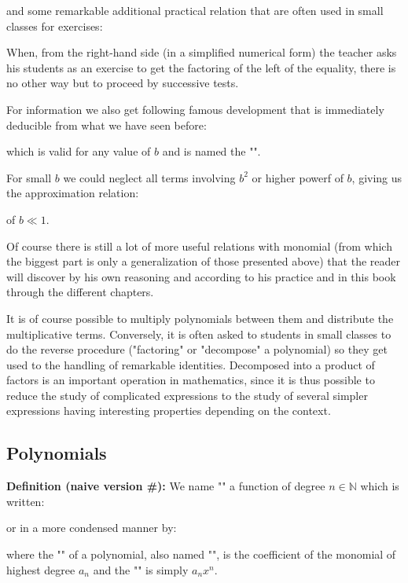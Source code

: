 	and some remarkable additional practical relation that are often used in small classes for exercises:
	
	\begin{tcolorbox}[title=Remark,colframe=black,arc=10pt]
	When, from the right-hand side (in a simplified numerical form) the teacher asks his students as an exercise to get the factoring of the left of the equality, there is no other way but to proceed by successive tests.
	\end{tcolorbox}
	For information we also get following famous development that is immediately deducible from what we have seen before:
	
	which is valid for any value of $b$ and is named the "". 
	
	For small $b$ we could neglect all terms involving $b^2$ or higher powerf of $b$, giving us the approximation relation:
	
	of $b\ll 1$.
	
	Of course there is still a lot of more useful relations with monomial (from which the biggest part is only a generalization of those presented above) that the reader will discover by his own reasoning and according to his practice and in this book through the different chapters.
	\begin{tcolorbox}[title=Remark,colframe=black,arc=10pt]
	It is of course possible to multiply polynomials between them and distribute the multiplicative terms. Conversely, it is often asked to students in small classes to do the reverse procedure ("factoring" or "decompose" a polynomial) so they get used to the handling of remarkable identities. Decomposed into a product of factors is an important operation in mathematics, since it is thus possible to reduce the study of complicated expressions to the study of several simpler expressions having interesting properties depending on the context.
	\end{tcolorbox}
	
	\subsection{Polynomials}
	\textbf{Definition (naive version \#\mydef):} We name "" a function of degree $n\in \mathbb{N}$ which is written:
	
	or in a more condensed manner by:
	
	 where the "" of a polynomial, also named "", is the coefficient of the monomial of highest degree $a_n$ and the "" is simply $a_nx^n$.
	 

